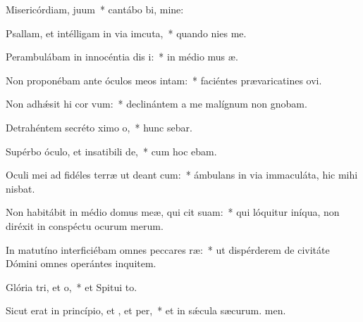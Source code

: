 \item Misericórdiam,  juum~* cantábo bi, mine:
\item Psallam, et intélligam in via imcuta,~* quando nies  me.
\item Perambulábam in innocéntia dis i:~* in médio mus æ.
\item Non proponébam ante óculos meos  intam:~* faciéntes prævaricatines ovi.
\item Non adhǽsit hi cor vum:~* declinántem a me malígnum non gnobam.
\item Detrahéntem secréto ximo o,~* hunc sebar.
\item Supérbo óculo, et insatibili de,~* cum hoc  ebam.
\item Oculi mei ad fidéles terræ ut deant cum:~* ámbulans in via immaculáta, hic mihi nisbat.
\item Non habitábit in médio domus meæ, qui cit suam:~* qui lóquitur iníqua, non diréxit in conspéctu ocurum merum.
\item In matutíno interficiébam omnes peccares ræ:~* ut dispérderem de civitáte Dómini omnes operántes inquitem.
\item Glória tri, et o,~* et Spitui to.
\item Sicut erat in princípio, et , et per,~* et in sǽcula sæcurum. men.
